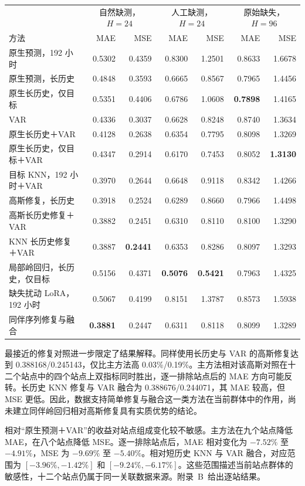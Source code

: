 \begin{tabular}{lrrrrrr}
\toprule
 & \multicolumn{2}{c}{自然缺测，$H=24$} & \multicolumn{2}{c}{人工缺测，$H=24$} & \multicolumn{2}{c}{原始缺失，$H=96$}\\
方法 & MAE & MSE & MAE & MSE & MAE & MSE\\
\midrule
原生预测，192 小时 & 0.5302 & 0.4359 & 0.8300 & 1.2501 & 0.8633 & 1.6678 \\
原生预测，长历史 & 0.4848 & 0.3593 & 0.6665 & 0.8567 & 0.7965 & 1.4456 \\
原生长历史，仅目标 & 0.5351 & 0.4406 & 0.6786 & 1.0608 & \textbf{0.7898} & 1.4165 \\
VAR & 0.4336 & 0.3037 & 0.6628 & 0.8248 & 0.8740 & 1.3634 \\
原生长历史＋VAR & 0.4128 & 0.2638 & 0.6354 & 0.7795 & 0.8098 & 1.3269 \\
原生长历史，仅目标＋VAR & 0.4347 & 0.2914 & 0.6170 & 0.7453 & 0.8052 & \textbf{1.3130} \\
目标 KNN，192 小时＋VAR & 0.3970 & 0.2644 & 0.6648 & 0.9118 & 0.8342 & 1.4266 \\
高斯修复，长历史 & 0.3918 & 0.2524 & 0.6289 & 0.8660 & 0.7966 & 1.4498 \\
高斯长历史修复＋VAR & 0.3882 & 0.2451 & 0.6310 & 0.8110 & 0.8100 & 1.3290 \\
KNN 长历史修复＋VAR & 0.3887 & \textbf{0.2441} & 0.6353 & 0.8286 & 0.8097 & 1.3293 \\
局部岭回归，长历史，仅目标 & 0.5156 & 0.4371 & \textbf{0.5076} & \textbf{0.5421} & 0.7963 & 1.4325 \\
缺失扰动 LoRA，192 小时 & 0.5067 & 0.4199 & 0.8151 & 1.3787 & 0.8573 & 1.5938 \\
\midrule
同伴序列修复与融合 & \textbf{0.3881} & 0.2447 & 0.6311 & 0.8118 & 0.8099 & 1.3289 \\
\bottomrule

\end{tabular}



最接近的修复对照进一步限定了结果解释。同样使用长历史与 VAR 的高斯修复达到 0.388168/0.245143，仅比主方法高 0.03\%/0.19\%。主方法相对该高斯对照在十二个站点中的四个站点上双指标同时胜出，逐一排除站点后的 MAE 方向可能反转。长历史 KNN 修复与 VAR 融合为 0.388676/0.244071，其 MAE 较高，但 MSE 更低。因此，数据支持简单修复与融合这一类方法在当前群体中的作用，尚未建立同伴岭回归相对高斯修复具有实质优势的结论。

相对“原生预测＋VAR”的收益对站点组成变化较不敏感。主方法在九个站点降低 MAE，在八个站点降低 MSE。逐一排除站点后，MAE 相对变化为 $-7.52\%$ 至 $-4.91\%$，MSE 为 $-9.69\%$ 至 $-5.40\%$。相对短历史 KNN 与 VAR 融合，对应范围为 $[-3.96\%,-1.42\%]$ 和 $[-9.24\%,-6.17\%]$。这些范围描述当前站点群体的敏感性，十二个站点仍属于同一关联数据来源。附录~B~给出逐站结果。

